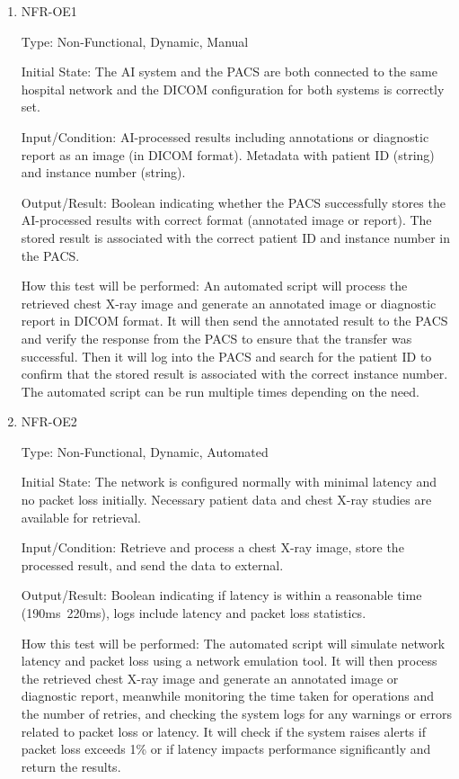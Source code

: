\documentclass[12pt, titlepage]{article}
\begin{document}
\begin{enumerate}

\item{NFR-OE1\\}\label{NFR-OE1}

Type: Non-Functional, Dynamic, Manual

Initial State: The AI system and the PACS are both connected to the same hospital network and the DICOM configuration for both systems is correctly set.

Input/Condition: AI-processed results including annotations or diagnostic report as an image (in DICOM format). Metadata with patient ID (string) and instance number (string).

Output/Result: Boolean indicating whether the PACS successfully stores the AI-processed results with correct format (annotated image or report). The stored result is associated with the correct patient ID and instance number in the PACS.

How this test will be performed: An automated script will process the retrieved chest X-ray image and generate an annotated image or diagnostic report in DICOM format. It will then send the annotated result to the PACS and verify the response from the PACS to ensure that the transfer was successful. Then it will log into the PACS and search for the patient ID to confirm that the stored result is associated with the correct instance number. The automated script can be run multiple times depending on the need.

\item{NFR-OE2\\}\label{NFR-OE2}

Type: Non-Functional, Dynamic, Automated

Initial State: The network is configured normally with minimal latency and no packet loss initially. Necessary patient data and chest X-ray studies are available for retrieval.

Input/Condition: Retrieve and process a chest X-ray image, store the processed result, and send the data to external.

Output/Result: Boolean indicating if latency is within a reasonable time (190ms~220ms), logs include latency and packet loss statistics.

How this test will be performed: The automated script will simulate network latency and packet loss using a network emulation tool. It will then process the retrieved chest X-ray image and generate an annotated image or diagnostic report, meanwhile monitoring the time taken for operations and the number of retries, and checking the system logs for any warnings or errors related to packet loss or latency. It will check if the system raises alerts if packet loss exceeds 1\% or if latency impacts performance significantly and return the results.

\end{enumerate}
\end{document}
